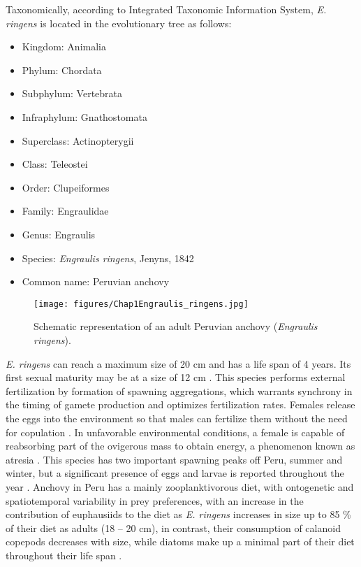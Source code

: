 Taxonomically, according to Integrated Taxonomic Information System, \textit{E. ringens} is located in the evolutionary tree as follows:\\

\begin{itemize}
  \centering
  \item Kingdom: Animalia
  \item Phylum: Chordata
  \item Subphylum: Vertebrata
  \item Infraphylum: Gnathostomata
  \item Superclass: Actinopterygii
  \item Class: Teleostei
  \item Order: Clupeiformes
  \item Family: Engraulidae
  \item Genus: Engraulis
  \item Species: \textit{Engraulis ringens}, Jenyns, 1842
  \item Common name: Peruvian anchovy
\end{itemize}

\begin{figure}[ht]
	\texttt{[image: figures/Chap1Engraulis\_ringens.jpg]}
	\centering
	\caption{Schematic representation of an adult Peruvian anchovy (\textit{Engraulis ringens}).}
	\label{Chap1Engraulis_ringens}
\end{figure}

\textit{E. ringens} can reach a maximum size of 20 cm and has a life span of 4 years. Its first sexual maturity may be at a size of 12 cm \citep{GutiSwar2007,MarzShin2009}. This species performs external fertilization by formation of spawning aggregations, which warrants synchrony in the timing of gamete production and optimizes fertilization rates. Females release the eggs into the environment so that males can fertilize them without the need for copulation \citep{Gani2014}. In unfavorable environmental conditions, a female is capable of reabsorbing part of the ovigerous mass to obtain energy, a phenomenon known as atresia \citep{PereRoqu2008,EspiVera2009,ClarCast2012,BuitPere2018}. This species has two important spawning peaks off Peru, summer and winter, but a significant presence of eggs and larvae is reported throughout the year \citep{MarzShin2009}. Anchovy in Peru has a mainly zooplanktivorous diet, with ontogenetic and spatiotemporal variability in prey preferences, with an increase in the contribution of euphausiids to the diet as \textit{E. ringens} increases in size up to 85 \% of their diet as adults (18 – 20 cm), in contrast, their consumption of calanoid copepods decreases with size, while diatoms make up a minimal part of their diet throughout their life span \citep{EspiBert2008,EspiBert2014}.\\

